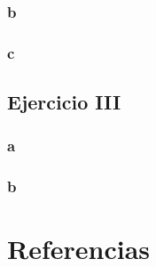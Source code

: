 \documentclass{article}
\begin{document}
\subsubsection*{b}

\subsubsection*{c}

\subsection*{Ejercicio III}

\subsubsection*{a}

\subsubsection*{b}

\section*{Referencias}
\end{document}
